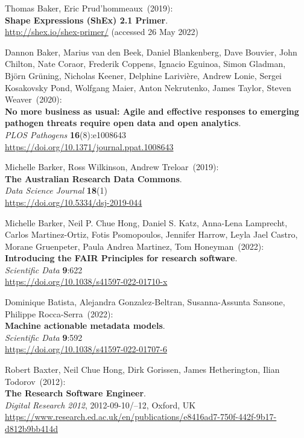 \begin{thebibliography}{9}
Thomas Baker, Eric Prud'hommeaux~(2019): \\
\textbf{Shape {Expressions} ({ShEx}) 2.1 {Primer}}. \\
\url{http://shex.io/shex-primer/} (accessed 26 May 2022)

Dannon Baker, Marius van den Beek, Daniel Blankenberg, Dave Bouvier, John Chilton, Nate Coraor, Frederik Coppens, Ignacio Eguinoa, Simon Gladman, Björn Grüning, Nicholas Keener, Delphine Larivière, Andrew Lonie, Sergei Kosakovsky Pond, Wolfgang Maier, Anton Nekrutenko, James Taylor, Steven Weaver~(2020): \\
\textbf{No more business as usual: Agile and effective responses to emerging pathogen threats require open data and open analytics}.\\
\emph{PLOS Pathogens} \textbf{16}(8):e1008643 \\
\url{https://doi.org/10.1371/journal.ppat.1008643}

Michelle Barker, Ross Wilkinson, Andrew Treloar~(2019): \\
\textbf{The Australian Research Data Commons}.\\
\emph{Data Science Journal} \textbf{18}(1) \\
\url{https://doi.org/10.5334/dsj-2019-044}

Michelle Barker, Neil P. Chue Hong, Daniel S. Katz, Anna-Lena Lamprecht, Carlos Martinez-Ortiz, Fotis Psomopoulos, Jennifer Harrow, Leyla Jael Castro, Morane Gruenpeter, Paula Andrea Martinez, Tom Honeyman~(2022):\\
\textbf{Introducing the FAIR Principles for research software}.\\
\emph{Scientific Data} \textbf{9}:622 \\
\url{https://doi.org/10.1038/s41597-022-01710-x}

Dominique Batista, Alejandra Gonzalez-Beltran, Susanna-Assunta Sansone, Philippe Rocca-Serra~(2022): \\
\textbf{Machine actionable metadata models}.\\
\emph{Scientific Data} \textbf{9}:592 \\
\url{https://doi.org/10.1038/s41597-022-01707-6}

Robert Baxter, Neil Chue Hong, Dirk Gorissen, James Hetherington, Ilian Todorov~(2012): \\
\textbf{The Research Software Engineer}.\\
\emph{Digital Research 2012}, 2012-09-10/--12, Oxford, UK\\
\url{https://www.research.ed.ac.uk/en/publications/e8416ad7-750f-442f-9b17-d812b9bb414d}


\end{thebibliography}
